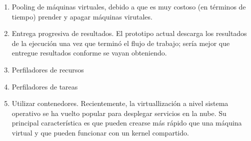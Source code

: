 \begin{enumerate}
\item{Pooling de m\'aquinas virtuales, debido a que es muy costoso (en t\'erminos de tiempo) prender y apagar m\'aquinas virutales.}
\item{Entrega progresiva de resultados. El prototipo actual descarga los resultados de la ejecuci\'on una vez que termin\'o el flujo de trabajo; ser\'ia mejor que entregue resultados conforme se vayan obteniendo.}
\item{Perfiladores de recursos}
\item{Perfiladores de tareas}
\item{Utilizar contenedores. Recientemente, la virtuallizaci\'on a nivel sistema operativo se ha vuelto popular para desplegar servicios en la nube. Su principal caracter\'istica es que pueden crearse m\'as r\'apido que una m\'aquina virtual y que pueden funcionar con un kernel compartido.}
\end{enumerate}
